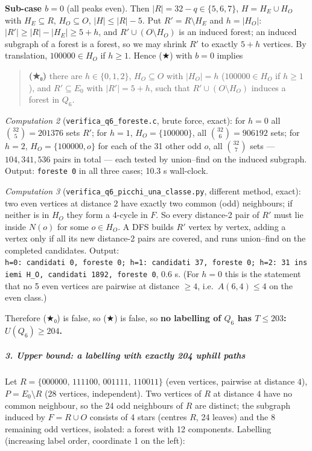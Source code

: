 \documentclass[11pt,a4paper]{article}
\begin{document}
\textbf{Sub-case \(b=0\)} (all peaks even). Then
\(|R|=32-q\in\{5,6,7\}\), \(H=H_E\cup H_O\) with \(H_E\subseteq R\),
\(H_O\subseteq O\), \(|H|\le|R|-5\). Put \(R'=R\setminus H_E\) and
\(h=|H_O|\): \(|R'|\ge|R|-|H_E|\ge5+h\), and \(R'\cup(O\setminus H_O)\)
is an induced forest; an induced subgraph of a forest is a forest, so we
may shrink \(R'\) to exactly \(5+h\) vertices. By translation,
\(100000\in H_O\) if \(h\ge1\). Hence (★) with \(b=0\) implies

\begin{quote}
\textbf{(★₀)} there are \(h\in\{0,1,2\}\), \(H_O\subseteq O\) with
\(|H_O|=h\) (\(100000\in H_O\) if \(h\ge1\)), and \(R'\subseteq E_0\)
with \(|R'|=5+h\), such that \(R'\cup(O\setminus H_O)\) induces a forest
in \(Q_6\).
\end{quote}

\emph{Computation 2} (\texttt{verifica\_q6\_foreste.c}, brute force,
exact): for \(h=0\) all \(\binom{32}{5}=201376\) sets \(R'\); for
\(h=1\), \(H_O=\{100000\}\), all \(\binom{32}{6}=906192\) sets; for
\(h=2\), \(H_O=\{100000,o\}\) for each of the 31 other odd \(o\), all
\(\binom{32}{7}\) sets --- \(104{,}341{,}536\) pairs in total --- each
tested by union--find on the induced subgraph. Output:
\texttt{foreste\ 0} in all three cases; 10.3 s wall-clock.

\emph{Computation 3} (\texttt{verifica\_q6\_picchi\_una\_classe.py},
different method, exact): two even vertices at distance \(2\) have
exactly two common (odd) neighbours; if neither is in \(H_O\) they form
a 4-cycle in \(F\). So every distance-2 pair of \(R'\) must lie inside
\(N(o)\) for some \(o\in H_O\). A DFS builds \(R'\) vertex by vertex,
adding a vertex only if all its new distance-2 pairs are covered, and
runs union--find on the completed candidates. Output:
\texttt{h=0:\ candidati\ 0,\ foreste\ 0;\ h=1:\ candidati\ 37,\ foreste\ 0;\ h=2:\ 31\ insiemi\ H\_O,\ candidati\ 1892,\ foreste\ 0},
0.6 s. (For \(h=0\) this is the statement that no 5 even vertices are
pairwise at distance \(\ge4\), i.e.~\(A(6,4)\le4\) on the even class.)

Therefore (★₀) is false, so (★) is false, so \textbf{no labelling of
\(Q_6\) has \(T\le203\): \(U(Q_6)\ge204\).}

\subparagraph{3. Upper bound: a labelling with exactly 204 uphill
paths}\label{upper-bound-a-labelling-with-exactly-204-uphill-paths}

Let \(R=\{000000,\,111100,\,001111,\,110011\}\) (even vertices, pairwise
at distance \(4\)), \(P=E_0\setminus R\) (28 vertices, independent). Two
vertices of \(R\) at distance \(4\) have no common neighbour, so the 24
odd neighbours of \(R\) are distinct; the subgraph induced by
\(F=R\cup O\) consists of 4 stars (centres \(R\), 24 leaves) and the 8
remaining odd vertices, isolated: a forest with 12 components. Labelling
(increasing label order, coordinate 1 on the left):
\end{document}
